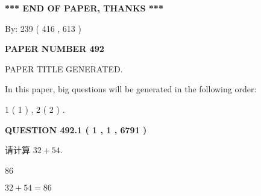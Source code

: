 \documentclass{ctexart}
\begin{document}
   
   
   
\vspace{1.0in} 
{\textbf{\large{ *** END OF PAPER, THANKS *** }}} 
   
   
\hspace{1.0in} By: 
 239 ( 416 ,  613 )
   
   
   
   
\newpage 
\setcounter{page}{ 
   492001 } 
   
   
   
   
 {\textbf{ \Large{ PAPER NUMBER  492  }}}
   
   
\vspace{0.2in}
   
   
   
   
   
   
   
   
 \vspace{0.2in}
 
 
 
 
   
   
 PAPER TITLE GENERATED.
   
   
   
\vspace{0.2in}
   
In this paper, big questions will be generated in the following order: 
   
   
   1 ( 1 )
 ,
   2 ( 2 )
 .
  
\vspace{0.2in}
  
{\textbf{\Large{QUESTION
492.1 
 ( 1 , 1 , 6791 )
}}}
  
  
 
请计算 $ %
32 +  %
54 $.
 
 
 
\noindent{}
 
 

86
 
 
\noindent{}
 
 

 
 
 
\noindent{}
 
 

$ %
32 +  %
54=   %
86$
 
\end{document}
